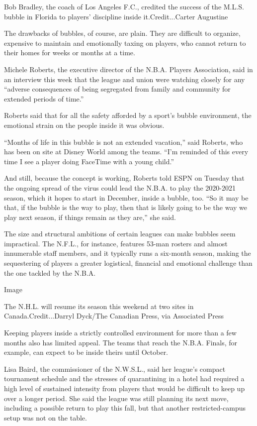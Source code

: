 Bob Bradley, the coach of Los Angeles F.C., credited the success of the
M.L.S. bubble in Florida to players' discipline inside
it.Credit...Carter Augustine

The drawbacks of bubbles, of course, are plain. They are difficult to
organize, expensive to maintain and emotionally taxing on players, who
cannot return to their homes for weeks or months at a time.

Michele Roberts, the executive director of the N.B.A. Players
Association, said in an interview this week that the league and union
were watching closely for any ``adverse consequences of being segregated
from family and community for extended periods of time.''

Roberts said that for all the safety afforded by a sport's bubble
environment, the emotional strain on the people inside it was obvious.

``Months of life in this bubble is not an extended vacation,'' said
Roberts, who has been on site at Disney World among the teams. ``I'm
reminded of this every time I see a player doing FaceTime with a young
child.''

And still, because the concept is working, Roberts told ESPN on Tuesday
that the ongoing spread of the virus could lead the N.B.A. to play the
2020-2021 season, which it hopes to start in December, inside a bubble,
too. ``So it may be that, if the bubble is the way to play, then that is
likely going to be the way we play next season, if things remain as they
are,'' she said.

The size and structural ambitions of certain leagues can make bubbles
seem impractical. The N.F.L., for instance, features 53-man rosters and
almost innumerable staff members, and it typically runs a six-month
season, making the sequestering of players a greater logistical,
financial and emotional challenge than the one tackled by the N.B.A.

Image

The N.H.L. will resume its season this weekend at two sites in
Canada.Credit...Darryl Dyck/The Canadian Press, via Associated Press

Keeping players inside a strictly controlled environment for more than a
few months also has limited appeal. The teams that reach the N.B.A.
Finals, for example, can expect to be inside theirs until October.

Lisa Baird, the commissioner of the N.W.S.L., said her league's compact
tournament schedule and the stresses of quarantining in a hotel had
required a high level of sustained intensity from players that would be
difficult to keep up over a longer period. She said the league was still
planning its next move, including a possible return to play this fall,
but that another restricted-campus setup was not on the table.

